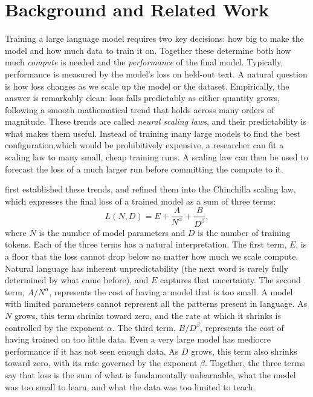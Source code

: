 \section{Background and Related Work}

Training a large language model requires two key decisions: how big to make the model and how much data to train it on. Together these determine both how much \textit{compute} is needed and the \textit{performance} of the final model. Typically, performance is measured by the model's loss on held-out text. A natural question is how loss changes as we scale up the model or the dataset. Empirically, the answer is remarkably clean: loss falls predictably as either quantity grows, following a smooth mathematical trend that holds across many orders of magnitude. These trends are called \emph{neural scaling laws}, and their predictability is what makes them useful. Instead of training many large models to find the best configuration,which would be prohibitively expensive, a researcher can fit a scaling law to many small, cheap training runs. A scaling law can then be used to forecast the loss of a much larger run before committing the compute to it.

\citet{kaplan2020scaling} first established these trends, and \citet{hoffmann2022training} refined them into the Chinchilla scaling law, which expresses the final loss of a trained model as a sum of three terms:
\begin{equation}
    L(N, D) = E + \frac{A}{N^\alpha} + \frac{B}{D^\beta},
    \label{eq:chinchilla}
\end{equation}
where $N$ is the number of model parameters and $D$ is the number of training tokens. Each of the three terms has a natural interpretation. The first term, $E$, is a floor that the loss cannot drop below no matter how much we scale compute. Natural language has inherent unpredictability (the next word is rarely fully determined by what came before), and $E$ captures that uncertainty. The second term, $A / N^\alpha$, represents the cost of having a model that is too small. A model with limited parameters cannot represent all the patterns present in language. As $N$ grows, this term shrinks toward zero, and the rate at which it shrinks is controlled by the exponent $\alpha$. The third term, $B / D^\beta$, represents the cost of having trained on too little data. Even a very large model has mediocre performance if it has not seen enough data. As $D$ grows, this term also shrinks toward zero, with its rate governed by the exponent $\beta$. Together, the three terms say that loss is the sum of what is fundamentally unlearnable, what the model was too small to learn, and what the data was too limited to teach.

